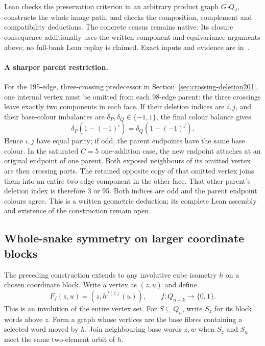\documentclass[11pt,a4paper]{article}
\theoremstyle{definition}
\theoremstyle{remark}
\begin{document}
Lean checks the preservation criterion in an arbitrary product graph
$G\square Q_2$, constructs the whole image path, and checks the
composition, complement and compatibility deductions. The concrete
census remains native. Its closure consequence additionally uses the
written component and equivariance arguments above; no full-bank Lean
replay is claimed. Exact inputs and evidence are in~\cite{research202}.

\paragraph{A sharper parent restriction.}
For the 195-edge, three-crossing predecessor in
Section~\ref{sec:crossing-deletion201}, one internal vertex must be
omitted from each 98-edge parent: the three crossings leave exactly
two components in each face. If their deletion indices are $i,j$,
and their base-colour imbalances are $\delta_P,\delta_Q\in\{-1,1\}$,
the final colour balance gives
\[
\delta_P(1-(-1)^i)=\delta_Q(1-(-1)^j).
\]
Hence $i,j$ have equal parity; if odd, the parent endpoints have the
same base colour. In the saturated $C=5$ one-addition case, the new
endpoint attaches at an original endpoint of one parent. Both exposed
neighbours of its omitted vertex are then crossing ports. The retained
opposite copy of that omitted vertex joins them into an entire two-edge
component in the other face. That other parent's deletion index is
therefore 3 or 95. Both indices are odd and the parent endpoint colours
agree. This is a written geometric deduction; its complete Lean assembly
and existence of the construction remain open.

\subsection{Whole-snake symmetry on larger coordinate blocks}
\label{sec:block203}
The preceding construction extends to any involutive cube isometry $h$
on a chosen coordinate block. Write a vertex as $(z,u)$ and define
\[
F_f(z,u)=(z,h^{f(z)}(u)),\qquad f:Q_{n-k}\longrightarrow\{0,1\}.
\]
This is an involution of the entire vertex set. For $S\subseteq Q_n$,
write $S_z$ for its block words above $z$. Form a graph whose vertices
are the base fibres containing a selected word moved by $h$. Join
neighbouring base words $z,w$ when $S_z$ and $S_w$ meet the same
two-element orbit of $h$.
\end{document}
